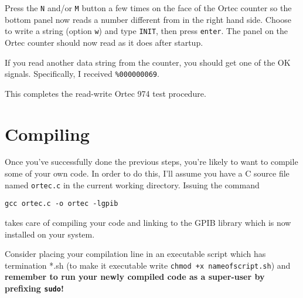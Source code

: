 \documentclass[letterpaper,11pt]{article}
\begin{document}
Press the \texttt{N} and/or \texttt{M} button a few times on the face of the Ortec counter so the bottom panel now reads a number different from  in the right hand side. Choose to write a string (option \texttt{w}) and type \texttt{INIT}, then press \texttt{enter}. The panel on the Ortec counter should now read  as it does after startup.

If you read another data string from the counter, you should get one of the OK signals. Specifically, I received \texttt{\%000000069}.

This completes the read-write Ortec 974 test procedure.

\section{Compiling}

Once you've successfully done the previous steps, you're likely to want to compile some of your own code. In order to do this, I'll assume you have a C source file named \texttt{ortec.c} in the current working directory. Issuing the command
\begin{verbatim}
gcc ortec.c -o ortec -lgpib
\end{verbatim}
takes care of compiling your code and linking to the GPIB library which is now installed on your system.

Consider placing your compilation line in an executable script which has termination *.sh (to make it executable write \texttt{chmod +x nameofscript.sh}) and \textbf{remember to run your newly compiled code as a super-user by prefixing \texttt{sudo}!}
\end{document}
